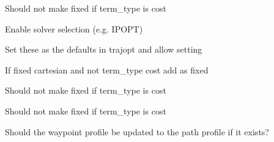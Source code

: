 \begin{DoxyRefList}
\label{todo__todo000032}%
%
Should not make fixed if term\+\_\+type is cost  
\item[Member \mbox{\hyperlink{classtesseract__planning_1_1TrajOptIfoptMotionPlanner_a8571318009fac584c15542ee8b2e4f04}{tesseract\+\_\+planning\+::Traj\+Opt\+Ifopt\+Motion\+Planner\+::solve}} (const \mbox{\hyperlink{structtesseract__planning_1_1PlannerRequest}{Planner\+Request}} \&request) const override]\label{todo__todo000028}%
%
Enable solver selection (e.\+g. IPOPT) 

\label{todo__todo000029}%
%
Set these as the defaults in trajopt and allow setting  
\item[Member \mbox{\hyperlink{classtesseract__planning_1_1TrajOptMotionPlanner_a6f42bc4743b8be6fd310b7e75282796d}{tesseract\+\_\+planning\+::Traj\+Opt\+Motion\+Planner\+::create\+Problem}} (const \mbox{\hyperlink{structtesseract__planning_1_1PlannerRequest}{Planner\+Request}} \&request) const]\label{todo__todo000025}%
%
If fixed cartesian and not term\+\_\+type cost add as fixed 

\label{todo__todo000026}%
%
Should not make fixed if term\+\_\+type is cost 

\label{todo__todo000027}%
%
Should not make fixed if term\+\_\+type is cost  
\item[Member \mbox{\hyperlink{classtesseract__planning_1_1UpdateEndStateTask_ac06636e6680de68245ea5ec5c06767cd}{tesseract\+\_\+planning\+::Update\+End\+State\+Task\+::run\+Impl}} (\mbox{\hyperlink{structtesseract__planning_1_1TaskComposerInput}{Task\+Composer\+Input}} \&input, Optional\+Task\+Composer\+Executor executor=std\+::nullopt) const override]\label{todo__todo000033}%
%
Should the waypoint profile be updated to the path profile if it exists? 
\end{DoxyRefList}
